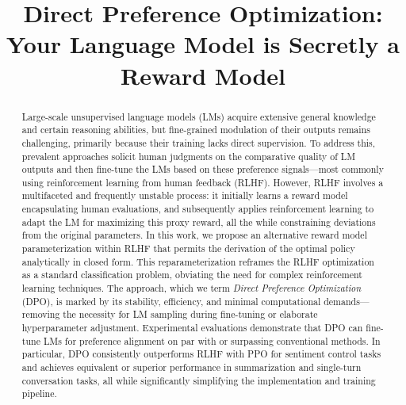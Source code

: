 \title{Direct Preference Optimization: Your Language Model is Secretly a Reward Model}

\begin{abstract}
Large-scale unsupervised language models (LMs) acquire extensive general knowledge and certain reasoning abilities, but fine-grained modulation of their outputs remains challenging, primarily because their training lacks direct supervision. To address this, prevalent approaches solicit human judgments on the comparative quality of LM outputs and then fine-tune the LMs based on these preference signals—most commonly using reinforcement learning from human feedback (RLHF). However, RLHF involves a multifaceted and frequently unstable process: it initially learns a reward model encapsulating human evaluations, and subsequently applies reinforcement learning to adapt the LM for maximizing this proxy reward, all the while constraining deviations from the original parameters. In this work, we propose an alternative reward model parameterization within RLHF that permits the derivation of the optimal policy analytically in closed form. This reparameterization reframes the RLHF optimization as a standard classification problem, obviating the need for complex reinforcement learning techniques. The approach, which we term \textit{Direct Preference Optimization} (DPO), is marked by its stability, efficiency, and minimal computational demands—removing the necessity for LM sampling during fine-tuning or elaborate hyperparameter adjustment. Experimental evaluations demonstrate that DPO can fine-tune LMs for preference alignment on par with or surpassing conventional methods. In particular, DPO consistently outperforms RLHF with PPO for sentiment control tasks and achieves equivalent or superior performance in summarization and single-turn conversation tasks, all while significantly simplifying the implementation and training pipeline.
\end{abstract}

